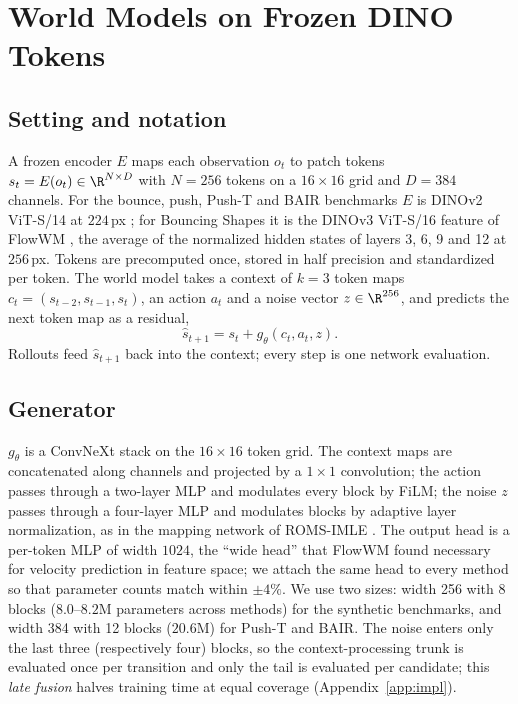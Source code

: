 \section{\Nom{} World Models on Frozen DINO Tokens}
\label{sec:method}

\subsection{Setting and notation}
A frozen encoder $E$ maps each observation $o_t$ to patch tokens $s_t = E(o_t) \in \R^{N \times D}$ with $N = 256$ tokens on a $16\times16$ grid and $D = 384$ channels. For the bounce, push, Push-T and BAIR benchmarks $E$ is DINOv2 ViT-S/14 at $224$\,px \citep{oquab2024dinov2}; for Bouncing Shapes it is the DINOv3 ViT-S/16 feature of FlowWM \citep{simeoni2025dinov3,porcher2026flowwm}, the average of the normalized hidden states of layers 3, 6, 9 and 12 at $256$\,px. Tokens are precomputed once, stored in half precision and standardized per token. The world model takes a context of $k = 3$ token maps $c_t = (s_{t-2}, s_{t-1}, s_t)$, an action $a_t$ and a noise vector $z \in \R^{256}$, and predicts the next token map as a residual,
\begin{equation}
\hat{s}_{t+1} = s_t + g_\theta(c_t, a_t, z).
\end{equation}
Rollouts feed $\hat{s}_{t+1}$ back into the context; every step is one network evaluation.

\subsection{Generator}
$g_\theta$ is a ConvNeXt stack \citep{liu2022convnext} on the $16\times16$ token grid. The context maps are concatenated along channels and projected by a $1\times1$ convolution; the action passes through a two-layer MLP and modulates every block by FiLM; the noise $z$ passes through a four-layer MLP and modulates blocks by adaptive layer normalization, as in the mapping network of ROMS-IMLE \citep{vashist2026roms}. The output head is a per-token MLP of width $1024$, the ``wide head'' that FlowWM found necessary for velocity prediction in feature space; we attach the same head to every method so that parameter counts match within $\pm4\%$. We use two sizes: width 256 with 8 blocks ($8.0$--$8.2$M parameters across methods) for the synthetic benchmarks, and width 384 with 12 blocks ($20.6$M) for Push-T and BAIR. The noise enters only the last three (respectively four) blocks, so the context-processing trunk is evaluated once per transition and only the tail is evaluated per candidate; this \emph{late fusion} halves training time at equal coverage (Appendix~\ref{app:impl}).

